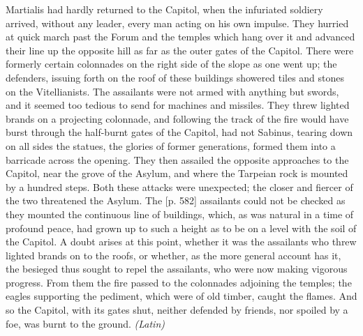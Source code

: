 Martialis had hardly returned to the Capitol, when the infuriated soldiery arrived, without any leader, every man acting on his own impulse. They hurried at quick march past the Forum and the temples which hang over it and advanced their line up the opposite hill as far as the outer gates of the Capitol. There were formerly certain colonnades on the right side of the slope as one went up; the defenders, issuing forth on the roof of these buildings showered tiles and stones on the Vitellianists. The assailants were not armed with anything but swords, and it seemed too tedious to send for machines and missiles. They threw lighted brands on a projecting colonnade, and following the track of the fire would have burst through the half-burnt gates of the Capitol, had not Sabinus, tearing down on all sides the statues, the glories of former generations, formed them into a barricade across the opening. They then assailed the opposite approaches to the Capitol, near the grove of the Asylum, and where the Tarpeian rock is mounted by a hundred steps. Both these attacks were unexpected; the closer and fiercer of the two threatened the Asylum. The [p. 582] assailants could not be checked as they mounted the continuous line of buildings, which, as was natural in a time of profound peace, had grown up to such a height as to be on a level with the soil of the Capitol. A doubt arises at this point, whether it was the assailants who threw lighted brands on to the roofs, or whether, as the more general account has it, the besieged thus sought to repel the assailants, who were now making vigorous progress. From them the fire passed to the colonnades adjoining the temples; the eagles supporting the pediment, which were of old timber, caught the flames. And so the Capitol, with its gates shut, neither defended by friends, nor spoiled by a foe, was burnt to the ground. \emph{(Latin)}


